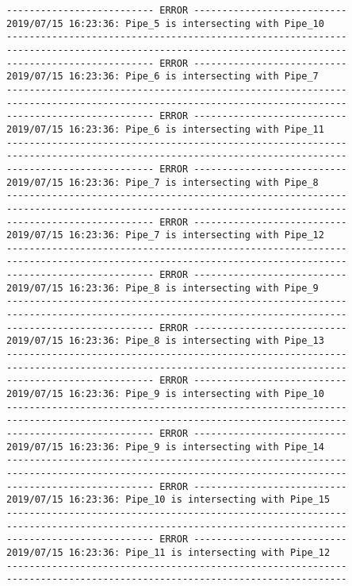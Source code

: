 \documentclass{article}
\begin{document}
{\begin{verbatim}
-------------------------- ERROR ---------------------------
2019/07/15 16:23:36: Pipe_5 is intersecting with Pipe_10
------------------------------------------------------------
------------------------------------------------------------
-------------------------- ERROR ---------------------------
2019/07/15 16:23:36: Pipe_6 is intersecting with Pipe_7
------------------------------------------------------------
------------------------------------------------------------
-------------------------- ERROR ---------------------------
2019/07/15 16:23:36: Pipe_6 is intersecting with Pipe_11
------------------------------------------------------------
------------------------------------------------------------
-------------------------- ERROR ---------------------------
2019/07/15 16:23:36: Pipe_7 is intersecting with Pipe_8
------------------------------------------------------------
------------------------------------------------------------
-------------------------- ERROR ---------------------------
2019/07/15 16:23:36: Pipe_7 is intersecting with Pipe_12
------------------------------------------------------------
------------------------------------------------------------
-------------------------- ERROR ---------------------------
2019/07/15 16:23:36: Pipe_8 is intersecting with Pipe_9
------------------------------------------------------------
------------------------------------------------------------
-------------------------- ERROR ---------------------------
2019/07/15 16:23:36: Pipe_8 is intersecting with Pipe_13
------------------------------------------------------------
------------------------------------------------------------
-------------------------- ERROR ---------------------------
2019/07/15 16:23:36: Pipe_9 is intersecting with Pipe_10
------------------------------------------------------------
------------------------------------------------------------
-------------------------- ERROR ---------------------------
2019/07/15 16:23:36: Pipe_9 is intersecting with Pipe_14
------------------------------------------------------------
------------------------------------------------------------
-------------------------- ERROR ---------------------------
2019/07/15 16:23:36: Pipe_10 is intersecting with Pipe_15
------------------------------------------------------------
------------------------------------------------------------
-------------------------- ERROR ---------------------------
2019/07/15 16:23:36: Pipe_11 is intersecting with Pipe_12
------------------------------------------------------------
------------------------------------------------------------

\end{verbatim}}
\end{document}
